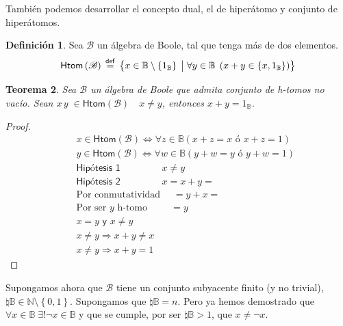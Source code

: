 \documentclass[final,12pt,a4paper,twoside,fleqn]{extbook}
\newcommand{\sthen}{\ensuremath{\Longrightarrow}}
\newcommand{\mathdef}{\ensuremath{\stackrel{\mathsf{def}}{{}={}}}}
\newcommand{\then}{\ensuremath{\sthen}}
\newcommand{\set}[1]{\ensuremath{\left\lbrace{#1}\right\rbrace}}
\newcommand {\setCompr}[2]{
	\ensuremath{
		\left\lbrace{ 
			#1 {\;\big{\vert}\;} #2
        }\right\rbrace
    }
}
\newcommand{\setN}{\ensuremath{\mathds{N}}}
\newcommand{\setB}{\ensuremath{\mathbb{B}}}
\newcommand{\algB}{\ensuremath{\mathscr{B}}}
\newtheorem{thm}{Teorema}[chapter]
\theoremstyle{definition}
\newtheorem{defn}[thm]{Definición}
\theoremstyle{remark}
\begin{document}
	También podemos desarrollar el concepto dual, el de hiperátomo y conjunto de hiperátomos. 



\begin{defn}
Sea \(\algB\) un álgebra de Boole, tal que tenga más de dos elementos.
\begin{equation}
  \mathsf{Htom}\left(\algB\right) \mathdef \setCompr{x \in \setB \setminus
  \set{1_\setB}} {\forall y \in \setB \; \left( x + y \in \set{ x ,
  1_\setB } \right)}
\end{equation}
\end{defn}




\begin{thm}
Sea \(\algB\) un álgebra de Boole que admita conjunto de h-tomos no vacío.
Sean \( x \, y \; \in \mathsf{Htom}\left({\algB}\right) \quad x \neq y \),
entonces \(x + y = 1_\setB \).
\end{thm}



\begin{proof}
\begin{eqnarray}
&&x \in \mathsf{Htom}\left({\algB}\right) \iff \forall z \in \setB \left(x
+ z = x \textsf{ ó } x + z = 1 \right) \\
&&y \in \mathsf{Htom}\left({\algB}\right) \iff \forall w \in \setB \left(y
+ w = y \textsf{ ó } y + w = 1 \right) \\
&&\textsf{Hipótesis   1   } \qquad\qquad x \neq y \\
&&\textsf{Hipótesis   2   } \qquad\qquad x = x + y = \\
&&\text{Por conmutatividad   } \quad = y + x = \\
&&\text{Por ser \(y\) h-tomo} \;\,\qquad = y \\
&& x = y \textsf{ y } x \neq y \\
&& x \neq y \then x + y \neq x \\
&& x \neq y \then x + y = 1
\end{eqnarray}
\end{proof}



	Supongamos ahora que \(\algB\) tiene un conjunto subyacente finito (y no
trivial),  \( \natural \setB \in \setN \setminus \set{0,1} \). Supongamos que
\(\natural \setB = n\). Pero ya hemos demostrado que \( \forall x \in \setB
\; \exists ! \neg x \in \setB \) y que se cumple, por ser \(\natural \setB >
1\), que \(x \neq \neg x\).
\end{document}

